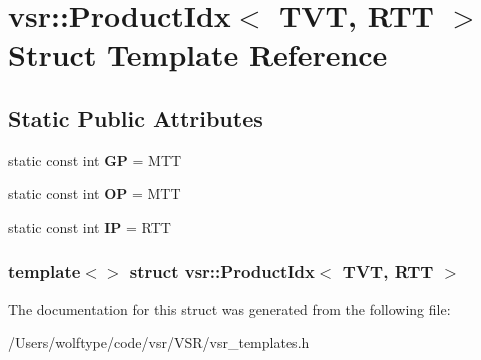 \hypertarget{structvsr_1_1_product_idx_3_01_t_v_t_00_01_r_t_t_01_4}{\section{vsr\-:\-:Product\-Idx$<$ T\-V\-T, R\-T\-T $>$ Struct Template Reference}
\label{structvsr_1_1_product_idx_3_01_t_v_t_00_01_r_t_t_01_4}
}
\subsection*{Static Public Attributes}
\begin{DoxyCompactItemize}
\item 
\hypertarget{structvsr_1_1_product_idx_3_01_t_v_t_00_01_r_t_t_01_4_aa6b017182d0873c5f42232447329ea8e}{static const int {\bfseries G\-P} = M\-T\-T}\label{structvsr_1_1_product_idx_3_01_t_v_t_00_01_r_t_t_01_4_aa6b017182d0873c5f42232447329ea8e}

\item 
\hypertarget{structvsr_1_1_product_idx_3_01_t_v_t_00_01_r_t_t_01_4_a9746013cc9dbe59b9c9013b6cb1223c1}{static const int {\bfseries O\-P} = M\-T\-T}\label{structvsr_1_1_product_idx_3_01_t_v_t_00_01_r_t_t_01_4_a9746013cc9dbe59b9c9013b6cb1223c1}

\item 
\hypertarget{structvsr_1_1_product_idx_3_01_t_v_t_00_01_r_t_t_01_4_a672a2076c72bbee86ae41da8acf2ff39}{static const int {\bfseries I\-P} = R\-T\-T}\label{structvsr_1_1_product_idx_3_01_t_v_t_00_01_r_t_t_01_4_a672a2076c72bbee86ae41da8acf2ff39}

\end{DoxyCompactItemize}
\subsubsection*{template$<$$>$ struct vsr\-::\-Product\-Idx$<$ T\-V\-T, R\-T\-T $>$}



The documentation for this struct was generated from the following file\-:\begin{DoxyCompactItemize}
\item 
/\-Users/wolftype/code/vsr/\-V\-S\-R/vsr\-\_\-templates.\-h\end{DoxyCompactItemize}
